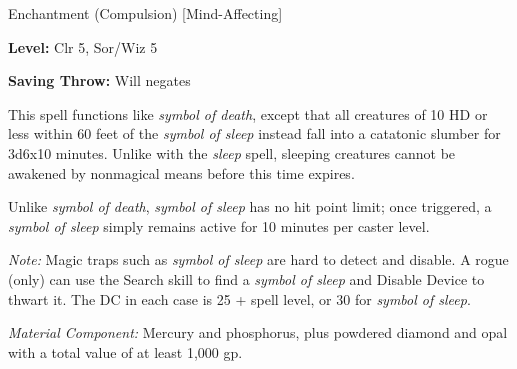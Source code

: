 
Enchantment (Compulsion) [Mind-Affecting]

\textbf{Level:} Clr 5, Sor/Wiz 5

\textbf{Saving Throw:} Will negates

This spell functions like \textit{symbol of death}, except that all creatures of 
10 HD or less within 60 feet of the \textit{symbol of sleep} instead fall into 
a catatonic slumber for 3d6x10 minutes. Unlike with the \textit{sleep} spell, sleeping 
creatures cannot be awakened by nonmagical means before this time expires.

Unlike \textit{symbol of death}, \textit{symbol of sleep} has no hit point limit; 
once triggered, a \textit{symbol of sleep} simply remains active for 10 minutes 
per caster level.

\textit{Note:} Magic traps such as \textit{symbol of sleep} are hard to detect 
and disable. A rogue (only) can use the Search skill to find a \textit{symbol of 
sleep} and Disable Device to thwart it. The DC in each case is 25 + spell level, 
or 30 for \textit{symbol of sleep}.

\textit{Material Component:} Mercury and phosphorus, plus powdered diamond and 
opal with a total value of at least 1,000 gp.

